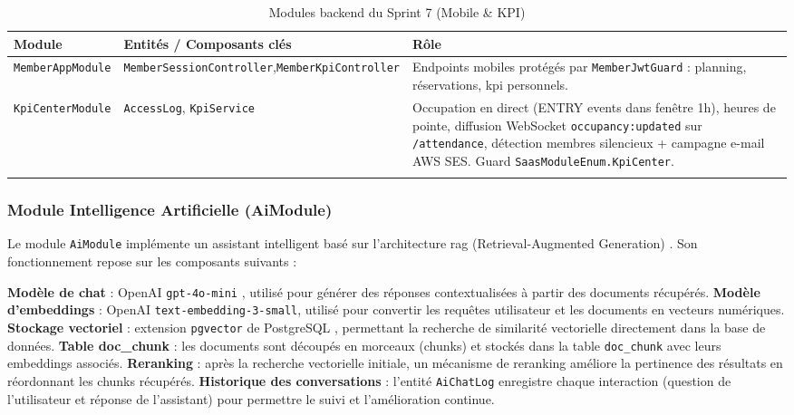 ﻿\documentclass[../main.tex]{subfiles}
\begin{document}
\begin{longtable}{|p{3.6cm}|>{\small}p{5.0cm}|p{5.1cm}|}
\hline
\textbf{Module} & \textbf{Entit\'{e}s / Composants cl\'{e}s} & \textbf{R\^{o}le} \\
\hline
\endfirsthead
\hline
\endfoot
\texttt{MemberAppModule} & \texttt{MemberSessionController},\newline\texttt{MemberKpiController} & Endpoints mobiles prot\'{e}g\'{e}s par \texttt{MemberJwtGuard} : planning, r\'{e}servations, \acrshort{kpi} personnels. \\
\hline
\texttt{KpiCenterModule} & \texttt{AccessLog}, \texttt{KpiService} & Occupation en direct (ENTRY events dans fen\^{e}tre 1h), heures de pointe, diffusion WebSocket \texttt{occupancy:updated} sur \texttt{/attendance}, d\'{e}tection membres silencieux + campagne e-mail AWS SES. Guard \texttt{SaasModuleEnum.KpiCenter}. \\
\hline
\caption{Modules backend du Sprint 7 (Mobile \& KPI)}
\end{longtable}

\subsubsection{Module Intelligence Artificielle (AiModule)}

Le module \texttt{AiModule} impl\'{e}mente un assistant intelligent bas\'{e} sur l'architecture \acrshort{rag} (Retrieval-Augmented Generation) \cite{lewis2020rag, gao2024rag_survey}. Son fonctionnement repose sur les composants suivants :

\begin{outline}
    \1 \textbf{Mod\`{e}le de chat} : OpenAI \texttt{gpt-4o-mini} \cite{openai}, utilis\'{e} pour g\'{e}n\'{e}rer des r\'{e}ponses contextualis\'{e}es \`{a} partir des documents r\'{e}cup\'{e}r\'{e}s.
    \1 \textbf{Mod\`{e}le d'embeddings} : OpenAI \texttt{text-embedding-3-small}, utilis\'{e} pour convertir les requ\^{e}tes utilisateur et les documents en vecteurs num\'{e}riques.
    \1 \textbf{Stockage vectoriel} : extension \texttt{pgvector} \cite{pgvector} de PostgreSQL \cite{postgre}, permettant la recherche de similarit\'{e} vectorielle directement dans la base de donn\'{e}es.
    \1 \textbf{Table doc\_chunk} : les documents sont d\'{e}coup\'{e}s en morceaux (chunks) et stock\'{e}s dans la table \texttt{doc\_chunk} avec leurs embeddings associ\'{e}s.
    \1 \textbf{Reranking} : apr\`{e}s la recherche vectorielle initiale, un m\'{e}canisme de reranking am\'{e}liore la pertinence des r\'{e}sultats en r\'{e}ordonnant les chunks r\'{e}cup\'{e}r\'{e}s.
    \1 \textbf{Historique des conversations} : l'entit\'{e} \texttt{AiChatLog} enregistre chaque interaction (question de l'utilisateur et r\'{e}ponse de l'assistant) pour permettre le suivi et l'am\'{e}lioration continue.
\end{outline}
\end{document}
